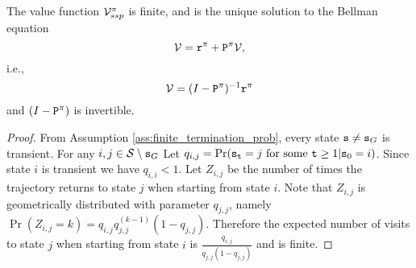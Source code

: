 \begin{proposition}\label{prop:bellman_FP_ssp}
    The value function $\mathcal{V}_{ssp}^\pi$ is finite, and is the unique solution to the Bellman equation
    \begin{equation}\label{eq:Bellman_fixed_policy_ssp}
        \mathcal{V} = {\tt r}^{\pi} + {\tt P}^\pi \mathcal{V},
    \end{equation}
    i.e.,
    \begin{equation*}
        \mathcal{V} = (I - {\tt P}^\pi)^{-1}{\tt r}^{\pi}
    \end{equation*}
    and $(I - {\tt P}^\pi)$ is invertible.
\end{proposition}

\begin{proof} 
From Assumption \ref{ass:finite_termination_prob}, every state ${\tt s} \neq {\tt s}_G$ is transient. For any $i,j \in \mathcal{S} \setminus {\tt s}_G$ Let $q_{i,j}=\Pr({{\tt s}_{\tt t}} =
j { \textrm{ for some }}{\tt t} \ge 1|{{\tt s}_0} = i) $. Since state $i$ is
transient we have $q_{i,i}<1$. Let $Z_{i,j}$ be the number of times the
trajectory returns to state $j$ when starting from state $i$. Note that $Z_{i,j}$ is geometrically
distributed with parameter $q_{j,j}$, namely $\Pr(Z_{i,j}=k) = q_{i,j}q_{j,j}^{(k-1)}(1 - q_{j,j}) $.
Therefore the expected number of visits to state $j$ when starting from state $i$ is $\frac{q_{i,j}}{q_{j,j}(1-q_{j,j})}$
and is finite.


\end{proof}

